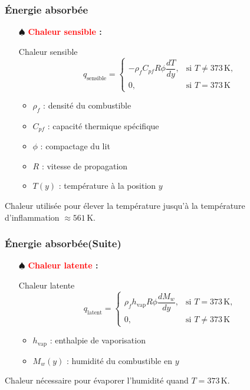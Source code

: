 \documentclass[handout]{beamer}
\newtheorem{pbm et hypo}[thm]{Problématique et hypothèses}
\begin{document}
	\begin{frame}
		\frametitle{Énergie absorbée}
		\begin{itemize}
			\item[$\spadesuit$] \textbf{\textcolor{red}{Chaleur sensible} : } \pause 
			\begin{block}{Chaleur sensible}
				\vspace{-1.5ex}
				\begin{equation}
					q_{\text{sensible}} = 
					\begin{cases}
						-\rho_f C_{pf} R \phi \dfrac{dT}{dy}, & \text{si } T \neq 373\,\mathrm{K}, \\
						0, & \text{si } T = 373\,\mathrm{K}
					\end{cases}
				\end{equation}
			\end{block}
			
			\begin{itemize}
				\item $\rho_f$ : densité du combustible
				\item $C_{pf}$ : capacité thermique spécifique
				\item $\phi$ : compactage du lit
				\item $R$ : vitesse de propagation
				\item $T(y)$ : température à la position $y$
			\end{itemize}
		\end{itemize}
		
		\vspace{1ex}
		\small Chaleur utilisée pour élever la température jusqu'à la température d'inflammation $\approx 561\,\mathrm{K}$.
	\end{frame}
	\begin{frame}
		\frametitle{Énergie absorbée(Suite)}
		
		\begin{itemize}
			\item[$\spadesuit$] \textbf{\textcolor{red}{Chaleur latente} : } \pause 
			\begin{block}{Chaleur latente}
				\vspace{-1.5ex}
				\begin{equation}
					q_{\text{latent}} = 
					\begin{cases}
						\rho_f h_{\text{vap}} R \phi \dfrac{dM_w}{dy}, & \text{si } T = 373\,\mathrm{K}, \\
						0, & \text{si } T \neq 373\,\mathrm{K}
					\end{cases}
				\end{equation}
			\end{block}
			
			\begin{itemize}
				\item $h_{\text{vap}}$ : enthalpie de vaporisation
				\item $M_w(y)$ : humidité du combustible en $y$
			\end{itemize}
		\end{itemize}
		
		\vspace{1ex}
		\small Chaleur nécessaire pour évaporer l'humidité quand  $T = 373\,\mathrm{K}$.
	\end{frame}
\end{document}
